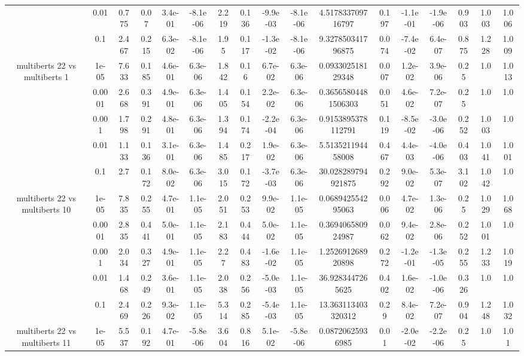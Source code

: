 \begin{tabular}{|c|c|c|c|c|c|c|c|c|c|c|c|c|c|c|c|c|}
 & 0.01 & 0.775 & 0.07 & 3.4e-01 & -8.1e-06 & 2.219 & 0.136 & -9.9e-03 & -8.1e-06 & 4.517833709716797 & 0.197 & -1.1e-01 & -1.9e-06 & 0.903 & 1.003 & 1.006 \\
 & 0.1 & 2.467 & 0.215 & 6.3e-02 & -8.1e-06 & 1.95 & 0.117 & -1.3e-02 & -8.1e-06 & 9.327850341796875 & 0.074 & -7.4e-02 & 6.4e-07 & 0.875 & 1.228 & 1.009 \\
\hline
\multirow{5}{*}{multiberts 22 vs multiberts 1} & 1e-05 & 7.633 & 0.185 & 4.6e-01 & 6.3e-06 & 1.842 & 0.16 & 6.7e-02 & 6.3e-06 & 0.093302518129348 & 0.007 & 1.2e-02 & 3.9e-06 & 0.25 & 1.0 & 1.013 \\
 & 0.0001 & 2.668 & 0.391 & 4.9e-01 & 6.3e-06 & 1.405 & 0.154 & 2.2e-02 & 6.3e-06 & 0.36565804481506303 & 0.051 & 4.6e-02 & 7.2e-07 & 0.25 & 1.0 & 1.0 \\
 & 0.001 & 1.798 & 0.291 & 4.8e-01 & 6.3e-06 & 1.394 & 0.174 & -2.2e-04 & 6.3e-06 & 0.9153895378112791 & 0.119 & -8.5e-02 & -3.0e-06 & 0.252 & 1.003 & 1.0 \\
 & 0.01 & 1.133 & 0.136 & 3.1e-01 & 6.3e-06 & 1.485 & 0.217 & 1.9e-02 & 6.3e-06 & 5.513521194458008 & 0.467 & 4.4e-03 & -4.0e-06 & 0.403 & 1.041 & 1.001 \\
 & 0.1 & 2.7 & 0.172 & 8.0e-02 & 6.3e-06 & 3.015 & 0.172 & -3.7e-03 & 6.3e-06 & 30.028289794921875 & 0.292 & 9.0e-02 & 5.3e-07 & 3.102 & 1.042 & 1.0 \\
\hline
\multirow{5}{*}{multiberts 22 vs multiberts 10} & 1e-05 & 7.835 & 0.255 & 4.7e-01 & 1.1e-05 & 2.051 & 0.253 & 9.9e-02 & 1.1e-05 & 0.068942554295063 & 0.006 & 4.7e-02 & 1.3e-06 & 0.25 & 1.029 & 1.068 \\
 & 0.0001 & 2.835 & 0.441 & 5.0e-01 & 1.1e-05 & 2.183 & 0.444 & 5.0e-02 & 1.1e-05 & 0.369406580924987 & 0.062 & 9.4e-02 & 2.8e-06 & 0.252 & 1.001 & 1.0 \\
 & 0.001 & 2.034 & 0.327 & 4.9e-01 & 1.1e-05 & 2.27 & 0.483 & -1.6e-02 & 1.1e-05 & 1.252691268920898 & 0.272 & -1.2e-01 & -1.3e-05 & 0.255 & 1.233 & 1.019 \\
 & 0.01 & 1.468 & 0.249 & 3.6e-01 & 1.1e-05 & 2.038 & 0.256 & -5.0e-03 & 1.1e-05 & 36.9283447265625 & 0.402 & 1.6e-02 & -1.0e-06 & 0.326 & 1.0 & 1.0 \\
 & 0.1 & 2.469 & 0.226 & 9.3e-02 & 1.1e-05 & 5.314 & 0.285 & -5.4e-03 & 1.1e-05 & 13.363113403320312 & 0.29 & 8.4e-02 & 7.2e-07 & 0.904 & 1.248 & 1.032 \\
\hline
\multirow{5}{*}{multiberts 22 vs multiberts 11} & 1e-05 & 5.537 & 0.192 & 4.7e-01 & -5.8e-06 & 3.604 & 0.816 & 5.1e-02 & -5.8e-06 & 0.08720625936985 & 0.01 & -2.0e-02 & -2.2e-06 & 0.25 & 1.0 & 1.01 \\

\end{tabular}
